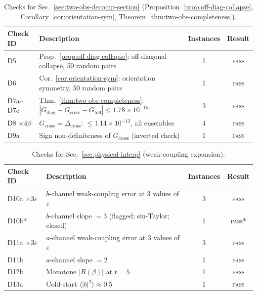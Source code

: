 \documentclass[12pt]{article}
\numberwithin{equation}{section}
\theoremstyle{plain}
\theoremstyle{definition}
\theoremstyle{remark}
\newcommand{\Gdiag}{G_{\mathrm{diag}}}     %
\newcommand{\Gcross}{G_{\mathrm{cross}}}   %
\newcommand{\Gfull}{G_{\mathrm{full}}}     %
\newcommand{\Dcross}{\Delta_{\mathrm{cross}}}  %
\begin{document}
		\begin{table}[ht]
			\centering
			\caption{Checks for Sec.~\ref{sec:two-obs-decomp-section}
				(Proposition~\ref{prop:off-diag-collapse},
				Corollary~\ref{cor:orientation-sym},
				Theorem~\ref{thm:two-obs-completeness}).}
			\label{tab:checks-S3}
			\small
			\setlength{\tabcolsep}{6pt}
			\begin{tabular}{@{}lp{8cm}cc@{}}
				\toprule
				\textbf{Check ID} & \textbf{Description}
				& \textbf{Instances} & \textbf{Result}\\
				\midrule
				D5      & Prop.~\ref{prop:off-diag-collapse}:
				off-diagonal collapse, 50 random pairs
				& 1 & \textsc{pass}\\
				D6      & Cor.~\ref{cor:orientation-sym}:
				orientation symmetry, 50 random pairs
				& 1 & \textsc{pass}\\
				D7a--D7c & Thm.~\ref{thm:two-obs-completeness}:
				$|\Gdiag + \Gcross - \Gfull|
				\leq 1.78\times 10^{-15}$
				& 3 & \textsc{pass}\\
				D8 $\times 4\beta$ & $\Gcross = \Dcross$:
				$\leq 1.14\times 10^{-13}$, all ensembles
				& 4 & \textsc{pass}\\
				D9a     & Sign non-definiteness of $\Gcross$
				(inverted check)
				& 1 & \textsc{pass}\\
				\bottomrule
			\end{tabular}
		\end{table}
		
		\begin{table}[ht]
			\centering
			\caption{Checks for Sec.~\ref{sec:physical-interp}
				(weak-coupling expansion).}
			\label{tab:checks-S4}
			\small
			\setlength{\tabcolsep}{6pt}
			\begin{tabular}{@{}lp{8cm}cc@{}}
				\toprule
				\textbf{Check ID} & \textbf{Description}
				& \textbf{Instances} & \textbf{Result}\\
				\midrule
				D10a $\times 3\varepsilon$
				& $b$-channel weak-coupling error at 3 values of $\varepsilon$
				& 3 & \textsc{pass}\\
				D10b*
				& $b$-channel slope $=3$ (flagged; sin-Taylor; closed)
				& 1 & \textsc{pass}*\\
				D11a $\times 3\varepsilon$
				& $a$-channel weak-coupling error at 3 values of $\varepsilon$
				& 3 & \textsc{pass}\\
				D11b  & $a$-channel slope $=2$
				& 1 & \textsc{pass}\\
				D12b  & Monotone $|R(\beta)|$ at $t=5$
				& 1 & \textsc{pass}\\
				D13a  & Cold-start $\langle|b|^2\rangle\approx 0.5$
				& 1 & \textsc{pass}\\
				\bottomrule
			\end{tabular}
		\end{table}
		
\end{document}
